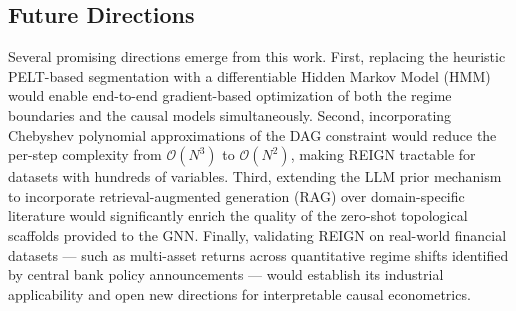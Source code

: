 \subsection{Future Directions}

Several promising directions emerge from this work. First, replacing the heuristic PELT-based segmentation with a differentiable Hidden Markov Model (HMM) would enable end-to-end gradient-based optimization of both the regime boundaries and the causal models simultaneously. Second, incorporating Chebyshev polynomial approximations of the DAG constraint would reduce the per-step complexity from $\mathcal{O}(N^3)$ to $\mathcal{O}(N^2)$, making REIGN tractable for datasets with hundreds of variables. Third, extending the LLM prior mechanism to incorporate retrieval-augmented generation (RAG) over domain-specific literature would significantly enrich the quality of the zero-shot topological scaffolds provided to the GNN. Finally, validating REIGN on real-world financial datasets — such as multi-asset returns across quantitative regime shifts identified by central bank policy announcements — would establish its industrial applicability and open new directions for interpretable causal econometrics.
